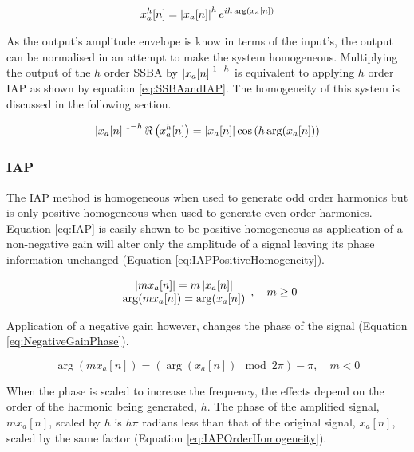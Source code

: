 			\begin{gather}
				x_{a}^{h}[n] = \left|x_{a}[n]\right|^{h} e^{ih\arg (x_{a}[n])}
				\label{eq:PolarSSBA}
			\end{gather}

			As the output's amplitude envelope is know in terms of the input's, the output can be normalised in
			an attempt to make the system homogeneous. Multiplying the output of the $h$ order SSBA
			by $\left|x_{a}[n]\right|^{1-h}$ is equivalent to applying $h$ order IAP as shown by equation
			\ref{eq:SSBAandIAP}. The homogeneity of this system is discussed in the following section.

			\begin{equation}
				\left|x_{a}[n]\right|^{1-h} \Re \left( x_{a}^{h}[n] \right) = 
				\left|x_{a}[n]\right| \cos \left( h\arg(x_{a}[n]) \right)
				\label{eq:SSBAandIAP}
			\end{equation}

		\subsubsection*{IAP}
			The IAP method is homogeneous when used to generate odd order harmonics but is only positive
			homogeneous when used to generate even order harmonics. Equation \ref{eq:IAP} is easily shown to be
			positive homogeneous as application of a non-negative gain will alter only the amplitude of a
			signal leaving its phase information unchanged (Equation \ref{eq:IAPPositiveHomogeneity}).

			\begin{equation}
				\begin{array}{c}
					\left|mx_{a}[n]\right| = m\left|x_{a}[n]\right| \\
					\arg(mx_{a}[n]) = \arg(x_{a}[n])
				\end{array}
				, \quad m \geq 0
				\label{eq:IAPPositiveHomogeneity}
			\end{equation}

			Application of a negative gain however, changes the phase of the signal (Equation
			\ref{eq:NegativeGainPhase}).
						
			\begin{equation}
				\arg(mx_{a}[n]) = (\arg(x_{a}[n]) \mod 2\pi) - \pi, \quad m < 0
				\label{eq:NegativeGainPhase}
			\end{equation}

			When the phase is scaled to increase the frequency, the effects depend on the order of the harmonic
			being generated, $h$. The phase of the amplified signal, $mx_{a}[n]$, scaled by $h$ is $h\pi$
			radians less than that of the original signal, $x_{a}[n]$, scaled by the same factor (Equation
			\ref{eq:IAPOrderHomogeneity}).

